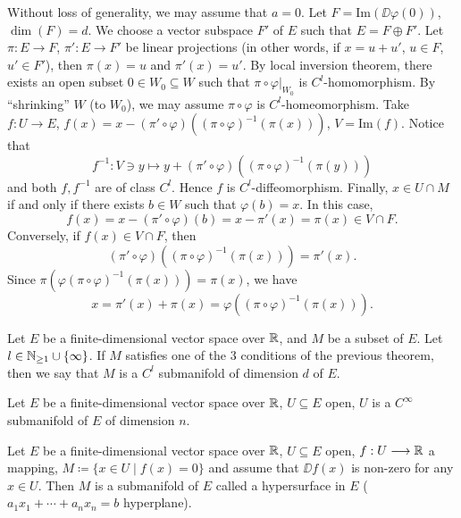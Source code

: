 \begin{proofenv}
\begin{enumerate}[label=\roman*.]
            Without loss of generality, we may assume that $a = 0$.
            Let $F = \mathrm{Im}(\DD \varphi (0))$, $\dim (F) = d$.
            We choose a vector subspace $F'$ of $E$ such that $E = F \oplus F'$.
            Let $\pi : E \longrightarrow F$, $\pi' : E \longrightarrow F'$ be linear projections (in other words, if $x = u + u'$, $u \in F$, $u' \in F'$),
            then $\pi(x) = u$ and $\pi'(x) = u'$.
            By local inversion theorem, there exists an open subset $0 \in W_0 \subseteq W$ such that 
            $\pi\circ \varphi |_{W_0}$ is $C^l$-homomorphism.
            By ``shrinking'' $W$ (to $W_0$), we may assume $\pi \circ \varphi$ is $C^l$-homeomorphism.
            Take $f : U \longrightarrow E$, $f(x) = x - (\pi' \circ \varphi)((\pi \circ \varphi)^{-1} (\pi(x)))$, $V = \mathrm{Im}(f)$.
            Notice that
            $$f^{-1} : V \ni y \mapsto y + (\pi' \circ \varphi)\left((\pi \circ \varphi)^{-1} (\pi(y))\right)$$
            and both $f,f^{-1}$ are of class $C^l$.
            Hence $f$ is $C^l$-diffeomorphism.
            Finally, $x \in U \cap M$ if and only if there exists $b \in W$ such that $\varphi(b) = x$.
            In this case,
            $$f(x) = x - (\pi' \circ \varphi)(b) = x - \pi'(x) = \pi(x) \in V \cap F.$$
            Conversely, if $f(x) \in V \cap F$, then
            $$(\pi' \circ \varphi)\left((\pi \circ \varphi)^{-1} (\pi(x))\right) = \pi'(x).$$
            Since $\pi(\varphi(\pi \circ \varphi)^{-1} (\pi (x))) = \pi(x)$,
            we have
            $$x = \pi'(x) + \pi(x) = \varphi\left((\pi \circ \varphi)^{-1}(\pi(x))\right).$$
    \end{enumerate}
\end{proofenv}

\begin{definitionenv}
    Let $E$ be a finite-dimensional vector space over $\mathbb{R}$, and $M$ be a subset of $E$.
    Let $l \in \mathbb{N}_{\ge 1} \cup \{\infty\}$.
    If $M$ satisfies one of the $3$ conditions of the previous theorem,
    then we say that $M$ is a $C^l$ submanifold of dimension $d$ of $E$.
\end{definitionenv}

\begin{exampleenv}
    Let $E$ be a finite-dimensional vector space over $\mathbb{R}$, $U \subseteq E$ open, $U$ is a $C^\infty$ submanifold of $E$ of dimension $n$.
\end{exampleenv}

\begin{exampleenv}
    Let $E$ be a finite-dimensional vector space over $\mathbb{R}$, $U \subseteq E$ open, $f : U \longrightarrow \mathbb{R}$ a mapping,
    $M \coloneq \{x \in U \mid f(x) = 0\}$ and assume that $\DD f(x)$ is non-zero for any $x \in U$. Then $M$ is a submanifold of $E$ called a hypersurface in $E$ ($a_1 x_1 + \cdots + a_n x_n = b$ hyperplane).
\end{exampleenv}

